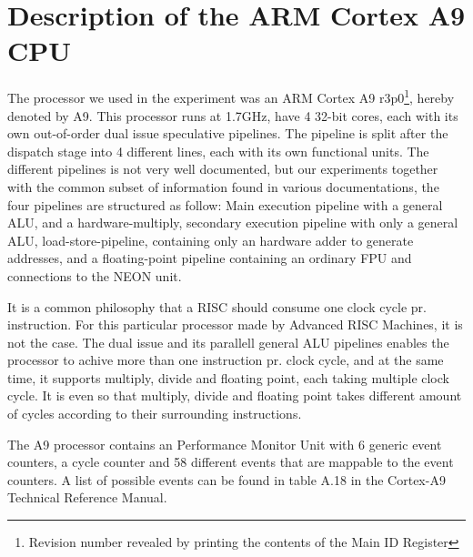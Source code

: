 \section{Description of the ARM Cortex A9 CPU}
The processor we used in the experiment was an ARM Cortex A9 r3p0\footnote{Revision number revealed by printing
the contents of the Main ID Register}, hereby denoted by A9. This processor runs at 1.7GHz,
have 4 32-bit cores, each with its own out-of-order dual issue speculative pipelines\cite{armtech}. The pipeline is split
after the dispatch stage into 4 different lines, each with its own functional units. The different
pipelines is not very well documented, but our experiments together with the common subset of information
found in various documentations\cite{armtech}\cite{7cpu}\cite{lotofdocs}, the four pipelines are structured as follow: Main execution pipeline with a  general ALU,
and a hardware-multiply, secondary execution pipeline with only a general ALU, load-store-pipeline, containing only
an hardware adder to generate addresses, and a floating-point pipeline containing an ordinary FPU and connections to
the NEON unit.

It is a common philosophy that a RISC should consume one clock cycle pr. instruction\cite{unknown}.
For this particular processor made by Advanced RISC Machines, it is not the case. The dual issue and its
 parallell general ALU pipelines enables the processor to achive more than one instruction pr. clock cycle,
and at the same time, it supports multiply, divide and floating point, each taking multiple clock cycle.
It is even so that multiply, divide and floating point takes different amount of cycles according to their
surrounding instructions.

The A9 processor contains an Performance Monitor Unit with 6 generic event counters, a cycle counter
and 58 different events that are mappable to the event counters\cite{armtech}. A list of possible events can be found in
table A.18 in the Cortex-A9 Technical Reference Manual\cite{armtech}.


